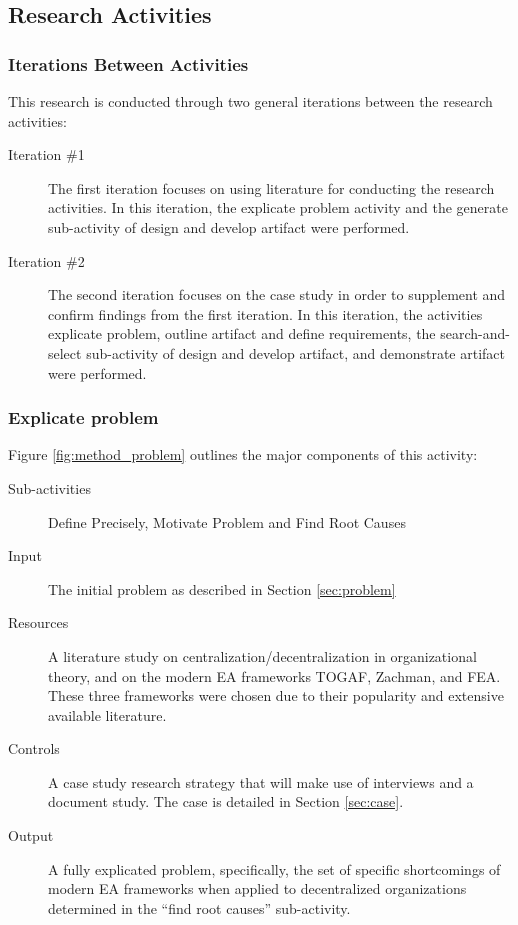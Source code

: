 \subsection{Research Activities}

\subsubsection*{Iterations Between Activities}

This research is conducted through two general iterations between the research activities:
\begin{description}
  \item[Iteration \#1] The first iteration focuses on using literature for conducting the research activities. In this iteration, the explicate problem activity and the generate sub-activity of design and develop artifact were performed. %
  \item[Iteration \#2] The second iteration focuses on the case study in order to supplement and confirm findings from the first iteration. In this iteration, the activities explicate problem, outline artifact and define requirements, the search-and-select sub-activity of design and develop artifact, and demonstrate artifact were performed.%
\end{description}

\subsubsection*{Explicate problem}

Figure \ref{fig:method_problem} outlines the major components of this activity:
\begin{description}
  \item[Sub-activities] Define Precisely, Motivate Problem and Find Root Causes~\cite[Ch. 5]{johannessonPerjons2012}
  \item[Input] The initial problem as described in Section \ref{sec:problem}
  \item[Resources] A literature study on centralization/decentralization in  organizational theory, and on the modern EA frameworks TOGAF, Zachman, and FEA. These three frameworks were chosen due to their popularity and extensive available literature.
  \item[Controls] A case study research strategy that will make use of interviews and a document study. The case is detailed in Section \ref{sec:case}. 
  \item[Output] A fully explicated problem, specifically, the set of specific shortcomings of modern EA frameworks when applied to decentralized organizations determined in the ``find root causes'' sub-activity.
\end{description}

